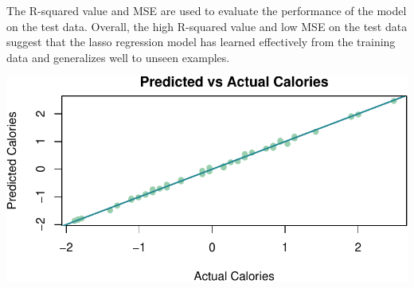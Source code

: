 \documentclass[
]{article}
\newenvironment{Shaded}{\begin{snugshade}}{\end{snugshade}}
\newcommand{\AttributeTok}[1]{\textcolor[rgb]{0.13,0.29,0.53}{#1}}
\newcommand{\DecValTok}[1]{\textcolor[rgb]{0.00,0.00,0.81}{#1}}
\newcommand{\FunctionTok}[1]{\textcolor[rgb]{0.13,0.29,0.53}{\textbf{#1}}}
\newcommand{\NormalTok}[1]{#1}
\newcommand{\OtherTok}[1]{\textcolor[rgb]{0.56,0.35,0.01}{#1}}
\newcommand{\SpecialCharTok}[1]{\textcolor[rgb]{0.81,0.36,0.00}{\textbf{#1}}}
\newcommand{\StringTok}[1]{\textcolor[rgb]{0.31,0.60,0.02}{#1}}
\begin{document}
The R-squared value and MSE are used to evaluate the performance of the
model on the test data. Overall, the high R-squared value and low MSE on
the test data suggest that the lasso regression model has learned
effectively from the training data and generalizes well to unseen
examples.

\begin{Shaded}
\end{Shaded}

\begin{center}\includegraphics{Statistical_Learning_Final_Report_files/figure-latex/accuracy_lm-1} \end{center}
\end{document}

